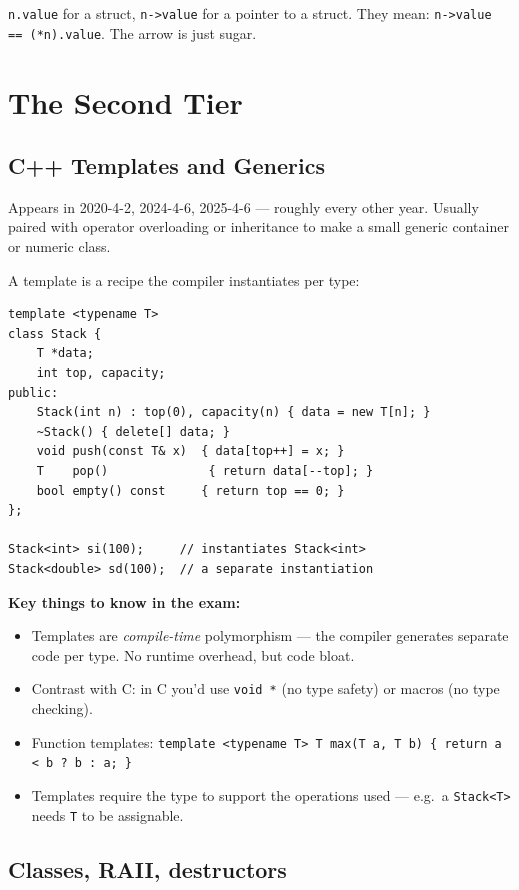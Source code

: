 \documentclass[11pt,a4paper]{article}
\begin{document}
\verb|n.value| for a struct, \verb|n->value| for a pointer to a struct. They mean: \verb|n->value == (*n).value|. The arrow is just sugar.

\hrulefill

\section{The Second Tier}

\subsection{C++ Templates and Generics}

\begin{useful}
Appears in 2020-4-2, 2024-4-6, 2025-4-6 --- roughly every other year. Usually paired with operator overloading or inheritance to make a small generic container or numeric class.
\end{useful}

A template is a recipe the compiler instantiates per type:

\begin{lstlisting}
template <typename T>
class Stack {
    T *data;
    int top, capacity;
public:
    Stack(int n) : top(0), capacity(n) { data = new T[n]; }
    ~Stack() { delete[] data; }
    void push(const T& x)  { data[top++] = x; }
    T    pop()              { return data[--top]; }
    bool empty() const     { return top == 0; }
};

Stack<int> si(100);     // instantiates Stack<int>
Stack<double> sd(100);  // a separate instantiation
\end{lstlisting}

\textbf{Key things to know in the exam:}
\begin{itemize}[leftmargin=*,itemsep=1pt]
  \item Templates are \emph{compile-time} polymorphism --- the compiler generates separate code per type. No runtime overhead, but code bloat.
  \item Contrast with C: in C you'd use \verb|void *| (no type safety) or macros (no type checking).
  \item Function templates: \verb|template <typename T> T max(T a, T b) { return a < b ? b : a; }|
  \item Templates require the type to support the operations used --- e.g.\ a \verb|Stack<T>| needs \verb|T| to be assignable.
\end{itemize}

\subsection{Classes, RAII, destructors}
\end{document}
